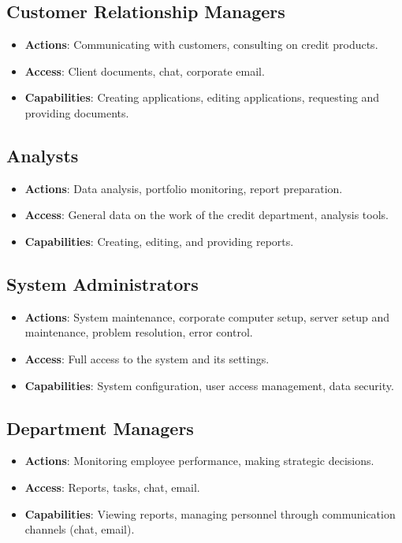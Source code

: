 \documentclass[20pt]{article}
\begin{document}
\subsection{Customer Relationship Managers}
\begin{itemize}
    \item \textbf{Actions}: Communicating with customers, consulting on credit products.
    \item \textbf{Access}: Client documents, chat, corporate email.
    \item \textbf{Capabilities}: Creating applications, editing applications, requesting and providing documents.
\end{itemize}

\subsection{Analysts}
\begin{itemize}
    \item \textbf{Actions}: Data analysis, portfolio monitoring, report preparation.
    \item \textbf{Access}: General data on the work of the credit department, analysis tools.
    \item \textbf{Capabilities}: Creating, editing, and providing reports.
\end{itemize}

\subsection{System Administrators}
\begin{itemize}
    \item \textbf{Actions}: System maintenance, corporate computer setup, server setup and maintenance, problem resolution, error control.
    \item \textbf{Access}: Full access to the system and its settings.
    \item \textbf{Capabilities}: System configuration, user access management, data security.
\end{itemize}

\subsection{Department Managers}
\begin{itemize}
    \item \textbf{Actions}: Monitoring employee performance, making strategic decisions.
    \item \textbf{Access}: Reports, tasks, chat, email.
    \item \textbf{Capabilities}: Viewing reports, managing personnel through communication channels (chat, email).
\end{itemize}
\end{document}
